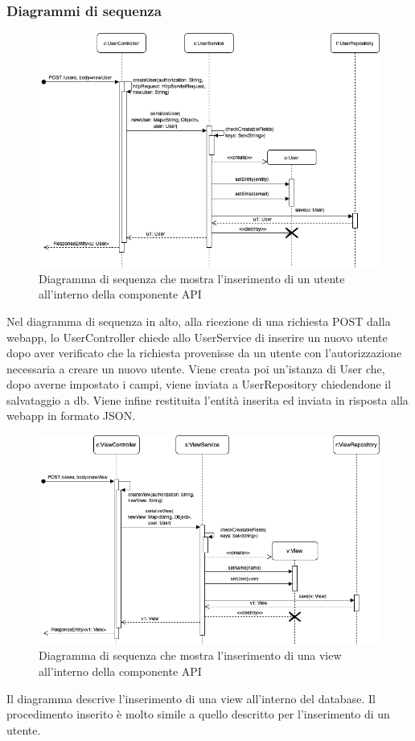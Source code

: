 \begin{landscape}
	\subsubsection{Diagrammi di sequenza}%
		\begin{figure}[H]
			\centering
			\includegraphics[scale=0.600]{res/images/API/inserimento_utente.png}
			\caption{Diagramma di sequenza che mostra l'inserimento di un utente all'interno della componente API}
			\label{Diagramma 17}
		\end{figure}
		Nel diagramma di sequenza in alto, alla ricezione di una richiesta POST dalla webapp, lo UserController chiede allo UserService di inserire un nuovo utente dopo aver verificato che la richiesta provenisse da un utente con l'autorizzazione necessaria a creare un nuovo utente. Viene creata poi un'istanza di User che, dopo averne impostato i campi, viene inviata a UserRepository chiedendone il salvataggio a db. Viene infine restituita l'entità inserita ed inviata in risposta alla webapp in formato JSON.
		\begin{figure}[H]
			\centering
			\includegraphics[scale=0.600]{res/images/API/inserimento_view.png}
			\caption{Diagramma di sequenza che mostra l'inserimento di una view all'interno della componente API}
			\label{Diagramma 18}
		\end{figure}
		Il diagramma descrive l'inserimento di una view all'interno del database. Il procedimento inserito è molto simile a quello descritto per l'inserimento di un utente.
	\end{landscape}
	

